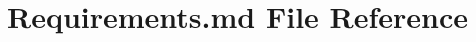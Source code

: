 \hypertarget{Requirements_8md}{}\section{Requirements.\+md File Reference}
\label{Requirements_8md}

